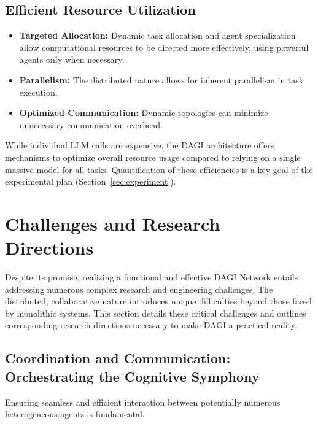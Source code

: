 \documentclass[12pt]{amsart}
\begin{document}
\subsection{Efficient Resource Utilization}
\begin{itemize}[leftmargin=*]
    \item \textbf{Targeted Allocation:} Dynamic task allocation and agent specialization allow computational resources to be directed more effectively, using powerful agents only when necessary.
    \item \textbf{Parallelism:} The distributed nature allows for inherent parallelism in task execution.
    \item \textbf{Optimized Communication:} Dynamic topologies can minimize unnecessary communication overhead.
\end{itemize}
While individual LLM calls are expensive, the DAGI architecture offers mechanisms to optimize overall resource usage compared to relying on a single massive model for all tasks. Quantification of these efficiencies is a key goal of the experimental plan (Section~\ref{sec:experiment}).

\section{Challenges and Research Directions}
\label{sec:challenges}
Despite its promise, realizing a functional and effective DAGI Network entails addressing numerous complex research and engineering challenges. The distributed, collaborative nature introduces unique difficulties beyond those faced by monolithic systems. This section details these critical challenges and outlines corresponding research directions necessary to make DAGI a practical reality.

\subsection{Coordination and Communication: Orchestrating the Cognitive Symphony}
\label{subsec:coordination}
Ensuring seamless and efficient interaction between potentially numerous heterogeneous agents is fundamental.
\end{document}
